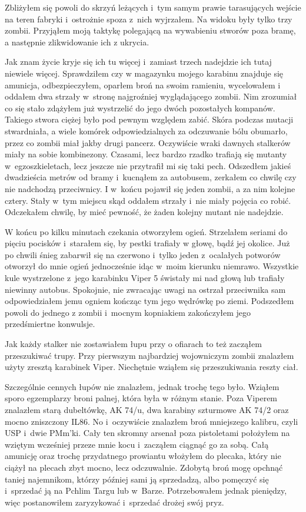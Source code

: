 \documentclass[../MAIN.tex]{subfiles}
\begin{document}
Zbliżyłem się powoli do skrzyń
leżących i~tym samym prawie tarasujących wejście na teren
fabryki i~ostrożnie spoza z~nich wyjrzałem. Na widoku były
tylko trzy zombii. Przyjąłem moją taktykę polegającą na
wywabieniu stworów poza bramę, a następnie zlikwidowanie ich z
ukrycia.

Jak znam życie kryje się ich tu więcej i~zamiast
trzech nadejdzie ich tutaj niewiele więcej. Sprawdziłem czy w
magazynku mojego karabinu znajduje się amunicja,
odbezpieczyłem, oparłem broń na swoim ramieniu, wycelowałem i
oddałem dwa strzały w~stronę najgroźniej wyglądającego zombii.
Nim zrozumiał co się stało zdążyłem już wystrzelić do jego
dwóch pozostałych kompanów. Takiego stwora ciężej było pod
pewnym względem zabić. Skóra podczas mutacji stwardniała, a
wiele komórek odpowiedzialnych za odczuwanie bólu obumarło,
przez co zombii miał jakby drugi pancerz. Oczywiście wraki
dawnych stalkerów miały na sobie kombinezony. Czasami, lecz
bardzo rzadko trafiają się mutanty w~egzoszkieletach, lecz
jeszcze nie przytrafił mi się taki pech. Odszedłem jakieś
dwadzieścia metrów od bramy i~kucnąłem za autobusem, zerkałem
co chwilę czy nie nadchodzą przeciwnicy. I w~końcu pojawił się
jeden zombii, a za nim kolejne cztery. Stały w~tym miejscu skąd
oddałem strzały i~nie miały pojęcia co robić. Odczekałem
chwilę, by mieć pewność, że żaden kolejny mutant nie nadejdzie.

W końcu po kilku minutach czekania otworzyłem ogień. Strzelałem
seriami do pięciu pocisków i~starałem się, by pestki trafiały w
głowę, bądź jej okolice. Już po chwili śnieg zabarwił się na
czerwono i~tylko jeden z~ocalałych potworów otworzył do mnie
ogień jednocześnie idąc w~moim kierunku niemrawo. Wszystkie
kule wystrzelone z~jego karabinku Viper 5 świstały mi nad głową
lub trafiały niewinny autobus. Spokojnie, nie zwracając uwagi
na ostrzał przeciwnika sam odpowiedziałem jemu ogniem kończąc
tym jego wędrówkę po ziemi. Podszedłem powoli do jednego z
zombii i~mocnym kopniakiem zakończyłem jego przedśmiertne
konwulsje.

Jak każdy stalker nie zostawiałem łupu przy o
ofiarach to też zacząłem przeszukiwać trupy. Przy pierwszym
najbardziej wojowniczym zombii znalazłem użyty zresztą
karabinek Viper. Niechętnie wziąłem się przeszukiwania reszty
ciał.

Szczególnie cennych łupów nie znalazłem, jednak trochę tego
było. Wziąłem sporo egzemplarzy broni palnej, która była w
różnym stanie. Poza Viperem znalazłem starą dubeltówkę, AK
74/u, dwa karabiny szturmowe AK 74/2 oraz mocno zniszczony
IL86. No i~oczywiście znalazłem broń mniejszego kalibru, czyli
USP i~dwie PMm’ki. Cały ten skromny arsenał poza pistoletami
położyłem na wziętym wcześniej przeze mnie kocu i~zacząłem
ciągnąć go za sobą. Całą amunicję oraz trochę przydatnego
prowiantu włożyłem do plecaka, który nie ciążył na plecach zbyt
mocno, lecz odczuwalnie. Zdobytą broń mogę opchnąć taniej
najemnikom, którzy później sami ją sprzedadzą, albo pomęczyć
się i~sprzedać ją na Pchlim Targu lub w~Barze. Potrzebowałem
jednak pieniędzy, więc postanowiłem zaryzykować i~sprzedać
drożej swój pryz.
\end{document}
